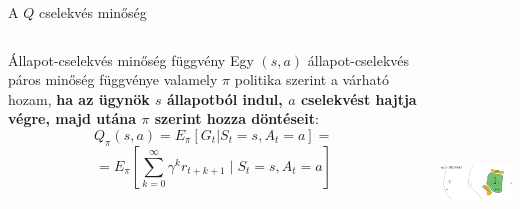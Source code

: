 \documentclass[english, aspectratio=169]{beamer}
\makeatletter
\let\origtableofcontents=\tableofcontents
\def\tableofcontents{\@ifnextchar[{\origtableofcontents}{\gobbletableofcontents}}
\def\gobbletableofcontents#1{\origtableofcontents}
\makeatother
\begin{document}
\begin{frame}
\tableofcontents[currentsection]
\end{frame}

\begin{frame}{A $Q$ cselekvés minőség}
\begin{columns}
\begin{column}{.5\textwidth}
\begin{block}{Állapot-cselekvés minőség függvény}
Egy $(s,a)$ állapot-cselekvés páros minőség függvénye valamely $\pi$ politika szerint a várható hozam, \textbf{ha az ügynök $s$ állapotból indul, $a$ cselekvést hajtja végre, majd utána $\pi$ szerint hozza döntéseit}:
\[
Q_{\pi}(s,a)=E_{\pi}\left[G_{t}|S_{t}=s,A_{t}=a\right]=
\]
\[
=E_{\pi}\left[\sum_{k=0}^{\infty}\gamma^{k}r_{t+k+1}\mid S_{t}=s,A_{t}=a\right]
\]
\end{block}
\end{column}
\begin{column}{.5\textwidth}
\begin{center}
\includegraphics[width=7cm, height=7cm, keepaspectratio]{images/reinforcement_14.png}
\end{center}
\end{column}
\end{columns}
\end{frame}
\end{document}
